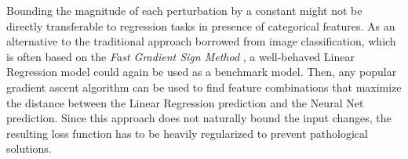 Bounding the magnitude of each perturbation by a constant might not be directly transferable to regression tasks in presence of categorical features.
As an alternative to the traditional approach borrowed from image classification, which is often based on the \emph{Fast Gradient Sign Method} \citep{goodfellow2015}, a well-behaved Linear Regression model could again be used as a benchmark model.
Then, any popular gradient ascent algorithm can be used to find feature combinations that maximize the distance between the Linear Regression prediction and the Neural Net prediction.
Since this approach does not naturally bound the input changes, the resulting loss function has to be heavily regularized to prevent pathological solutions.
